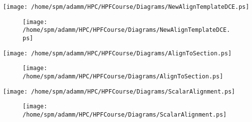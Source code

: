 \documentclass{article}
\begin{document}
{\newpage
\clearpage
\samepage \texttt{[image: /home/spm/adamm/HPC/HPFCourse/Diagrams/NewAlignTemplateDCE.ps]}
}

{\newpage
\clearpage
\samepage \begin{figure}[H]
\hspace*{3.0cm}\texttt{[image: /home/spm/adamm/HPC/HPFCourse/Diagrams/NewAlignTemplateDCE.ps]}

\label{StridedTemplateAlignmentVisualisation:fig}
\end{figure}
}

{\newpage
\clearpage
\samepage \texttt{[image: /home/spm/adamm/HPC/HPFCourse/Diagrams/AlignToSection.ps]}
}

{\newpage
\clearpage
\samepage {}
}

{\newpage
\clearpage
\samepage \begin{figure}[H]
\hspace*{3.0cm}\texttt{[image: /home/spm/adamm/HPC/HPFCourse/Diagrams/AlignToSection.ps]}

\label{EmbeddedAlignmentVisualisation:fig}
\end{figure}
}

{\newpage
\clearpage
\samepage \texttt{[image: /home/spm/adamm/HPC/HPFCourse/Diagrams/ScalarAlignment.ps]}
}

{\newpage
\clearpage
\samepage \begin{figure}[H]
\hspace*{3.0cm}\texttt{[image: /home/spm/adamm/HPC/HPFCourse/Diagrams/ScalarAlignment.ps]}

\label{AlignedScalarVisualisation:fig}
\end{figure}
}

{\newpage
\clearpage
\samepage {}
}

{\newpage
\clearpage
\samepage \begin{figure}[H]
\begin{center}

\label{IndependentExample1Visualisation:fig}
\end{center}
\end{figure}
}
\end{document}
